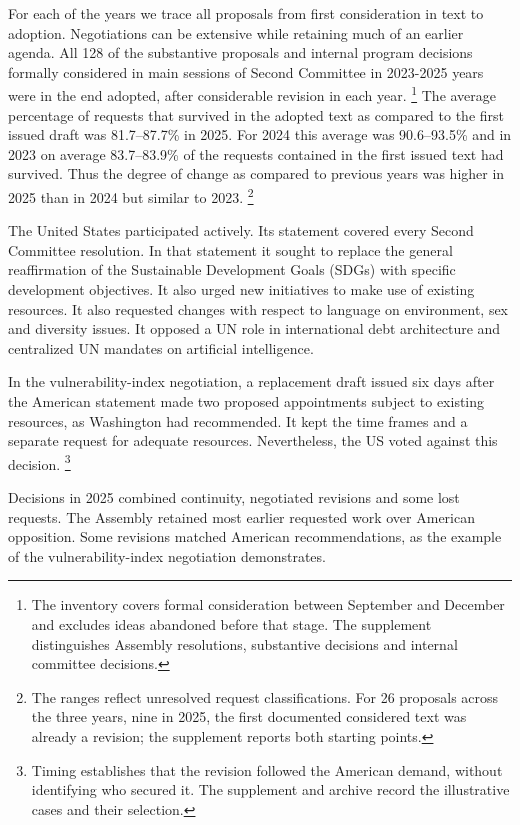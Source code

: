 \documentclass[12pt,authoryear]{elsarticle}
\begin{document}
For each of the years we trace all proposals from first consideration in text to adoption. Negotiations can be extensive while retaining much of an earlier agenda. All 128 of the substantive proposals and internal program decisions formally considered in main sessions of Second Committee in 2023-2025 years were in the end adopted, after considerable revision in each year. \footnote{The inventory covers formal consideration between September and December and excludes ideas abandoned before that stage. The supplement distinguishes Assembly resolutions, substantive decisions and internal committee decisions.} The average percentage of requests that survived in the adopted text as compared to the first issued draft was 81.7--87.7\% in 2025. For 2024 this average was 90.6--93.5\% and in 2023 on average 83.7--83.9\% of the requests contained in the first issued text had survived. Thus the degree of change as compared to previous years was higher in 2025 than in 2024 but similar to 2023. \footnote{The ranges reflect unresolved request classifications. For 26 proposals across the three years, nine in 2025, the first documented considered text was already a revision; the supplement reports both starting points.}

The United States participated actively. Its statement covered every Second Committee resolution. In that statement it sought to replace the general reaffirmation of the Sustainable Development Goals (SDGs) with specific development objectives. It also urged new initiatives to make use of existing resources. It also requested changes with respect to language on environment, sex and diversity issues. It opposed a UN role in international debt architecture and centralized UN mandates on artificial intelligence. \citep{usun:2025:longform}

In the vulnerability-index negotiation, a replacement draft issued six days after the American statement made two proposed appointments subject to existing resources, as Washington had recommended. It kept the time frames and a separate request for adequate resources. Nevertheless, the US voted against this decision. \footnote{Timing establishes that the revision followed the American demand, without identifying who secured it. The supplement and archive record the illustrative cases and their selection.}

Decisions in 2025 combined continuity, negotiated revisions and some lost requests. The Assembly retained most earlier requested work over American opposition. Some revisions matched American recommendations, as the example of the vulnerability-index negotiation demonstrates.
\end{document}
